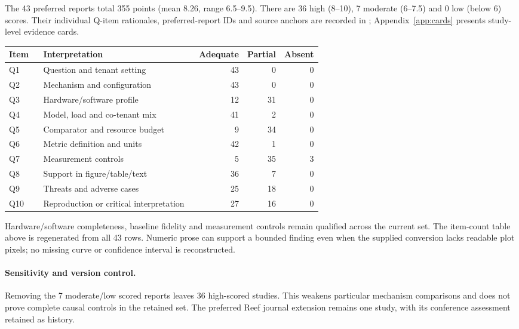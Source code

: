 The 43 preferred reports total 355 points (mean 8.26, range 6.5--9.5). There are 36 high (8--10), 7 moderate (6--7.5) and 0 low (below 6) scores. Their individual Q-item rationales, preferred-report IDs and source anchors are recorded in ; Appendix~\ref{app:cards} presents study-level evidence cards.

\begin{longtable}{P{0.11\linewidth}P{0.50\linewidth}rrr}

\toprule Item & Interpretation & Adequate & Partial & Absent\\\midrule\endhead

Q1 & Question and tenant setting & 43 & 0 & 0\\

Q2 & Mechanism and configuration & 43 & 0 & 0\\

Q3 & Hardware/software profile & 12 & 31 & 0\\

Q4 & Model, load and co-tenant mix & 41 & 2 & 0\\

Q5 & Comparator and resource budget & 9 & 34 & 0\\

Q6 & Metric definition and units & 42 & 1 & 0\\

Q7 & Measurement controls & 5 & 35 & 3\\

Q8 & Support in figure/table/text & 36 & 7 & 0\\

Q9 & Threats and adverse cases & 25 & 18 & 0\\

Q10 & Reproduction or critical interpretation & 27 & 16 & 0\\

\bottomrule\end{longtable}

Hardware/software completeness, baseline fidelity and measurement controls remain qualified across the current set. The item-count table above is regenerated from all 43 rows. Numeric prose can support a bounded finding even when the supplied conversion lacks readable plot pixels; no missing curve or confidence interval is reconstructed.

\paragraph{Sensitivity and version control.} Removing the 7 moderate/low scored reports leaves 36 high-scored studies. This weakens particular mechanism comparisons and does not prove complete causal controls in the retained set. The preferred Reef journal extension remains one study, with its conference assessment retained as history.

